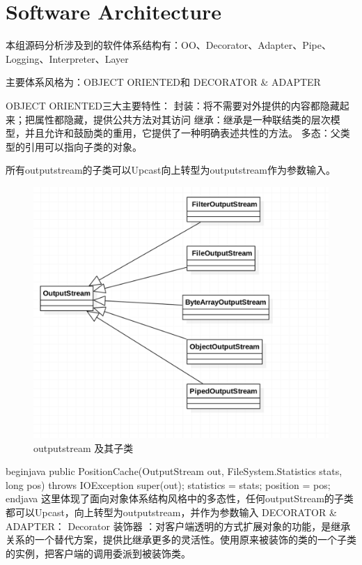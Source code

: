 \section{Software Architecture}
\label{sec:sa}

本组源码分析涉及到的软件体系结构有：OO、Decorator、Adapter、Pipe、Logging、Interpreter、Layer

主要体系风格为：OBJECT ORIENTED和 DECORATOR \& ADAPTER

OBJECT ORIENTED三大主要特性：
封装：将不需要对外提供的内容都隐藏起来；把属性都隐藏，提供公共方法对其访问
继承：继承是一种联结类的层次模型，并且允许和鼓励类的重用，它提供了一种明确表述共性的方法。
多态：父类型的引用可以指向子类的对象。

所有outputstream的子类可以Upcast向上转型为outputstream作为参数输入。
\begin{figure}[h]
\centering
\includegraphics[width =1\linewidth]{output.png}
\caption{outputstream 及其子类}
\label{fig:OutputStream}
\end{figure}
begin{java}
public PositionCache(OutputStream out,
                     FileSystem.Statistics stats,
                     long pos) throws IOException {
  super(out);
  statistics = stats;
  position = pos;
}
end{java}
这里体现了面向对象体系结构风格中的多态性，任何outputStream的子类都可以Upcast，向上转型为outputstream，并作为参数输入
DECORATOR \& ADAPTER：
Decorator 装饰器 ：对客户端透明的方式扩展对象的功能，是继承关系的一个替代方案，提供比继承更多的灵活性。使用原来被装饰的类的一个子类的实例，把客户端的调用委派到被装饰类。
